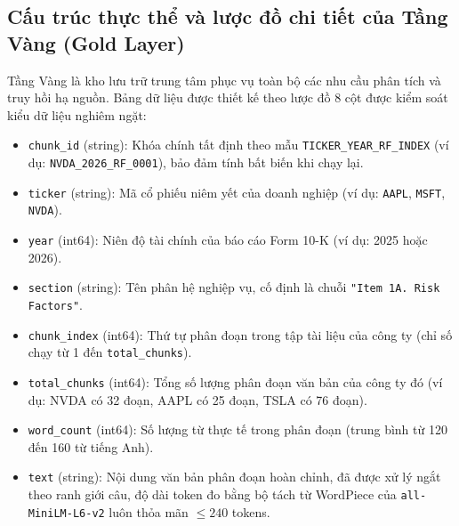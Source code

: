 \subsection{Cấu trúc thực thể và lược đồ chi tiết của Tầng Vàng (Gold Layer)}
Tầng Vàng là kho lưu trữ trung tâm phục vụ toàn bộ các nhu cầu phân tích và truy hồi hạ nguồn. Bảng dữ liệu  được thiết kế theo lược đồ 8 cột được kiểm soát kiểu dữ liệu nghiêm ngặt:
\begin{itemize}
    \item \texttt{chunk\_id} (string): Khóa chính tất định theo mẫu \texttt{TICKER\_YEAR\_RF\_INDEX} (ví dụ: \texttt{NVDA\_2026\_RF\_0001}), bảo đảm tính bất biến khi chạy lại.
    \item \texttt{ticker} (string): Mã cổ phiếu niêm yết của doanh nghiệp (ví dụ: \texttt{AAPL}, \texttt{MSFT}, \texttt{NVDA}).
    \item \texttt{year} (int64): Niên độ tài chính của báo cáo Form 10-K (ví dụ: 2025 hoặc 2026).
    \item \texttt{section} (string): Tên phân hệ nghiệp vụ, cố định là chuỗi \texttt{"Item 1A. Risk Factors"}.
    \item \texttt{chunk\_index} (int64): Thứ tự phân đoạn trong tập tài liệu của công ty (chỉ số chạy từ 1 đến \texttt{total\_chunks}).
    \item \texttt{total\_chunks} (int64): Tổng số lượng phân đoạn văn bản của công ty đó (ví dụ: NVDA có 32 đoạn, AAPL có 25 đoạn, TSLA có 76 đoạn).
    \item \texttt{word\_count} (int64): Số lượng từ thực tế trong phân đoạn (trung bình từ 120 đến 160 từ tiếng Anh).
    \item \texttt{text} (string): Nội dung văn bản phân đoạn hoàn chỉnh, đã được xử lý ngắt theo ranh giới câu, độ dài token đo bằng bộ tách từ WordPiece của \texttt{all-MiniLM-L6-v2} luôn thỏa mãn $\le 240$ tokens.
\end{itemize}

